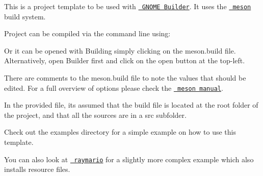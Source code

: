This is a project template to be used with \href{https://raw.githubusercontent.com/jubalh/raymario/master/meson.build}{\texttt{ GNOME Builder}}. It uses the \href{https://raw.githubusercontent.com/jubalh/raymario/master/meson.build}{\texttt{ meson}} build system.

Project can be compiled via the command line using\+: 
\begin{DoxyCode}{0}

\end{DoxyCode}


Or it can be opened with Building simply clicking on the {\ttfamily meson.\+build} file. Alternatively, open Builder first and click on the {\ttfamily open} button at the top-\/left.

There are comments to the {\ttfamily meson.\+build} file to note the values that should be edited. For a full overview of options please check the \href{http://mesonbuild.com/Manual.html}{\texttt{ meson manual}}.

In the provided file, it\textquotesingle{}s assumed that the build file is located at the root folder of the project, and that all the sources are in a {\ttfamily src} subfolder.

Check out the {\ttfamily examples} directory for a simple example on how to use this template.

You can also look at \href{https://github.com/jubalh/raymario}{\texttt{ raymario}} for a slightly more complex example which also installs resource files. 